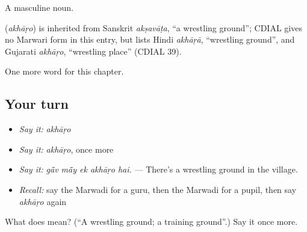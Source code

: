 A masculine noun.

\begin{cousinweb}
\textbf{} (\emph{akhāṛo}) is inherited from Sanskrit \emph{akṣavāṭa}, \textquotedblleft{}a wrestling ground\textquotedblright{}; CDIAL gives no Marwari form in this entry, but lists Hindi \emph{akhāṛā}, \textquotedblleft{}wrestling ground\textquotedblright{}, and Gujarati \emph{akhāṛo}, \textquotedblleft{}wrestling place\textquotedblright{} (CDIAL 39).
\end{cousinweb}

\begin{grammarlens}[title={What you've built}]
One more word for this chapter.
\end{grammarlens}

\subsection*{Your turn}
\begin{itemize}
\raggedright
  \item \emph{Say it:} \emph{akhāṛo}
  \item \emph{Say it:} \emph{akhāṛo}, once more
  \item \emph{Say it:} \emph{gā̃v mā̃y ek akhāṛo hai.} — There's a wrestling ground in the village.
  \item \emph{Recall:} say the Marwadi for a guru, then the Marwadi for a pupil, then say \emph{akhāṛo} again
\end{itemize}

\begin{tcolorbox}[breakable,colback=teal!4,colframe=teal!35!black,title={Before you move on}]
What does  mean? (\textquotedblleft{}A wrestling ground; a training ground\textquotedblright{}.) Say it once more.
\end{tcolorbox}
